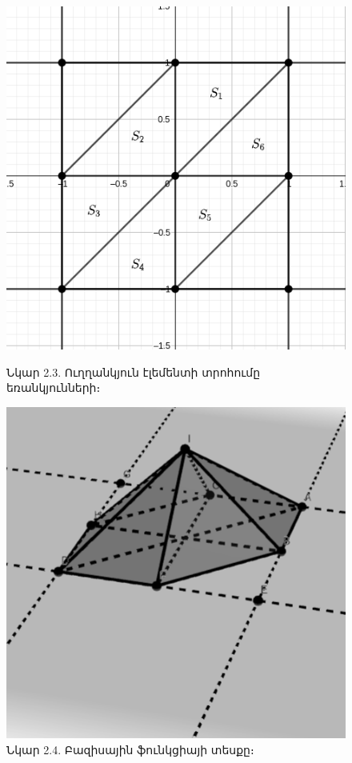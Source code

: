\documentclass[fleqn, bachelor,subf,12pt,notitlepage]{article}
\begin{document}
\begin{figure}[H]
  \centering
  \begin{minipage}[b]{0.4\textwidth}
    \includegraphics[width=\textwidth]{images/two_var_courant_1}
    \captionsetup{labelformat=empty}
    \caption{Նկար 2.3. Ուղղանկյուն էլեմենտի տրոհումը եռանկյունների։}
  \end{minipage}
  \hfill
  \begin{minipage}[b]{0.4\textwidth}
    \includegraphics[width=\textwidth]{images/two_var_courant_2}
    \captionsetup{labelformat=empty}
    \caption{Նկար 2.4. Բազիսային ֆունկցիայի տեսքը։}
  \end{minipage}
\end{figure}
\end{document}
